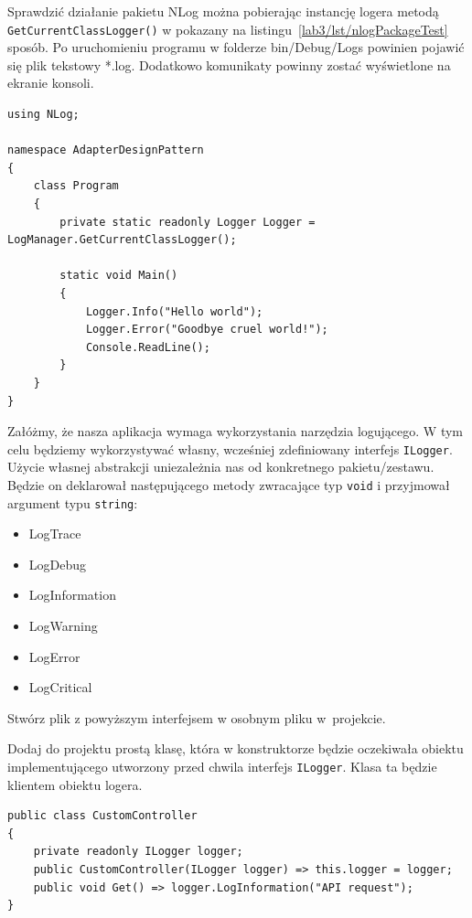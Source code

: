 Sprawdzić działanie pakietu NLog można pobierając instancję logera metodą \texttt{GetCurrentClassLogger()} w pokazany na listingu~\ref{lab3/lst/nlogPackageTest} sposób. Po uruchomieniu programu w folderze bin/Debug/Logs powinien pojawić się plik tekstowy *.log. Dodatkowo komunikaty powinny zostać wyświetlone na ekranie konsoli.
\begin{lstlisting}[caption={Wywołanie metod logujących pakietu NLog}, label={lab3/lst/nlogPackageTest}]
using NLog;

namespace AdapterDesignPattern
{
	class Program
	{
		private static readonly Logger Logger = LogManager.GetCurrentClassLogger();
		
		static void Main()
		{
			Logger.Info("Hello world");
			Logger.Error("Goodbye cruel world!");
			Console.ReadLine();
		}
	}
}
\end{lstlisting}


Załóżmy, że nasza aplikacja wymaga wykorzystania narzędzia logującego. W tym celu będziemy wykorzystywać własny, wcześniej zdefiniowany interfejs \texttt{ILogger}. Użycie własnej abstrakcji uniezależnia nas od konkretnego pakietu/zestawu. Będzie on deklarował następującego metody zwracające typ \texttt{void} i przyjmował argument typu \texttt{string}:
\begin{itemize}
	\item LogTrace
	\item LogDebug
	\item LogInformation
	\item LogWarning
	\item LogError
	\item LogCritical
\end{itemize}
Stwórz plik z powyższym interfejsem w osobnym pliku w~projekcie. 

Dodaj do projektu prostą klasę, która w konstruktorze będzie oczekiwała obiektu implementującego utworzony przed chwila interfejs \texttt{ILogger}. Klasa ta będzie klientem obiektu logera. 
\begin{lstlisting}[caption={Przykład klasy wykorzystującej obiekt klasy implementującej \texttt{ILogger}}, label={lab3/lst/customControllerWithLogger}]
public class CustomController
{
	private readonly ILogger logger;
	public CustomController(ILogger logger) => this.logger = logger;
	public void Get() => logger.LogInformation("API request");
}
\end{lstlisting}

